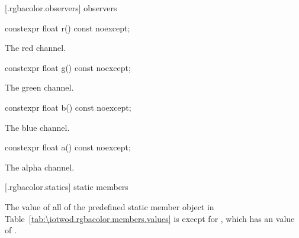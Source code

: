  [\iotwod.rgbacolor.observers]{ observers}

%
\begin{itemdecl}
constexpr float r() const noexcept;
\end{itemdecl}
\begin{itemdescr}
\pnum
\returns
The red channel.
\end{itemdescr}

%
\begin{itemdecl}
constexpr float g() const noexcept;
\end{itemdecl}
\begin{itemdescr}
\pnum
\returns
The green channel.
\end{itemdescr}

%
\begin{itemdecl}
constexpr float b() const noexcept;
\end{itemdecl}
\begin{itemdescr}
\pnum
\returns
The blue channel.
\end{itemdescr}

%
\begin{itemdecl}
constexpr float a() const noexcept;
\end{itemdecl}
\begin{itemdescr}
\pnum
\returns
The alpha channel.
\end{itemdescr}

 [\iotwod.rgbacolor.statics] { static members}

\pnum
The  value of all of the predefined  static member object in Table~\ref{tab:\iotwod.rgbacolor.members.values} is  except for , which has an  value of .

